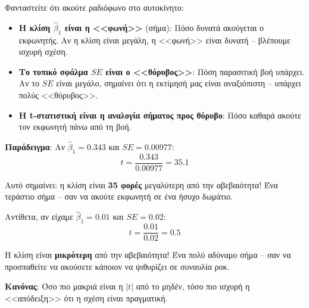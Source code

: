 \documentclass[12pt,a4paper]{article}
\begin{document}
\begin{examplebox}
Φανταστείτε ότι ακούτε ραδιόφωνο στο αυτοκίνητο:

\begin{itemize}
    \item \textbf{Η κλίση $\hat{\beta}_1$ είναι η <<φωνή>>} (σήμα): Πόσο δυνατά ακούγεται ο εκφωνητής. Αν η κλίση είναι μεγάλη, η <<φωνή>> είναι δυνατή -- βλέπουμε ισχυρή σχέση.

    \item \textbf{Το τυπικό σφάλμα $SE$ είναι ο <<θόρυβος>>}: Πόση παρασιτική βοή υπάρχει. Αν το $SE$ είναι μεγάλο, σημαίνει ότι η εκτίμησή μας είναι αναξιόπιστη -- υπάρχει πολύς <<θόρυβος>>.

    \item \textbf{Η t-στατιστική είναι η αναλογία σήματος προς θόρυβο}: Πόσο καθαρά ακούτε τον εκφωνητή πάνω από τη βοή.
\end{itemize}

\textbf{Παράδειγμα}: Αν $\hat{\beta}_1 = 0.343$ και $SE = 0.00977$:
$$t = \frac{0.343}{0.00977} = 35.1$$

Αυτό σημαίνει: η κλίση είναι \textbf{35 φορές} μεγαλύτερη από την αβεβαιότητα! Ένα τεράστιο σήμα -- σαν να ακούτε εκφωνητή σε ένα ήσυχο δωμάτιο.

Αντίθετα, αν είχαμε $\hat{\beta}_1 = 0.01$ και $SE = 0.02$:
$$t = \frac{0.01}{0.02} = 0.5$$

Η κλίση είναι \textbf{μικρότερη} από την αβεβαιότητα! Ένα πολύ αδύναμο σήμα -- σαν να προσπαθείτε να ακούσετε κάποιον να ψιθυρίζει σε συναυλία ροκ.

\textbf{Κανόνας}: Όσο πιο μακριά είναι η $|t|$ από το μηδέν, τόσο πιο ισχυρή η <<απόδειξη>> ότι η σχέση είναι πραγματική.
\end{examplebox}
\end{document}
